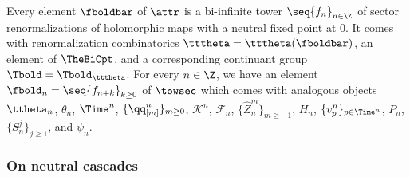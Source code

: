 \documentclass{amsart}
\begin{document}
Every element $\fboldbar$ of $\attr$ is a bi-infinite tower $\seq{f_n}_{n\in\Z}$ of sector renormalizations of holomorphic maps with a neutral fixed point at $0$.
It comes with renormalization combinatorics $\tttheta = \tttheta(\fboldbar)$, an element of $\TheBiCpt$, and a corresponding continuant group $\Tbold = \Tbold_{\tttheta}$.
For every $n \in \Z$, we have an element $\fbold_n = \seq{ f_{n+k} }_{k\geq 0}$ of $\overline{\towsec}$ which comes with analogous objects $\ttheta_n$, $\theta_n$, $\Time^{n}$, $\{ \qq^n_{[m]} \}_{m \geq 0}$, $\mathcal{K}^n$, $\mathcal{F}_n$, $\{ \hat{Z}_n^m \}_{m \geq -1}$, $H_n$, $\{ v^n_p \}_{p \in \Time^{n}}$, $P_n$, $\{S_n^j\}_{j \geq 1}$, and $\psi_n$.

\subsubsection{On neutral cascades}
\label{sss:cascade}
\end{document}
